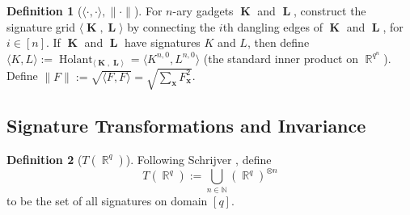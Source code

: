 \documentclass{article}
\theoremstyle{remark}
\theoremstyle{definition}
\newtheorem{definition}{Definition}[section]
\DeclareMathOperator{\rr}{\mathbb{R}}
\DeclareMathOperator{\vk}{\mathbf{K}}
\DeclareMathOperator{\vl}{\mathbf{L}}
\DeclareMathOperator{\vx}{\mathbf{x}}
\DeclareMathOperator{\holant}{Holant}
\begin{document}
\begin{definition}[$\langle\cdot,\cdot\rangle,\|\cdot\|$]
    For $n$-ary gadgets $\vk$ and $\vl$, construct the signature grid
    $\langle \vk,\vl \rangle$ by connecting the $i$th dangling edges
    of $\vk$ and $\vl$, for $i \in [n]$.
    If $\vk$ and $\vl$ have signatures $K$ and $L$, then define $\langle K,L \rangle
    := \holant_{\langle \vk,\vl\rangle} = \langle K^{n,0}, L^{n,0}\rangle$ (the standard
    inner product on $\rr^{q^n}$). Define $\|F\| := \sqrt{\langle F,F\rangle} = \sqrt{\sum_{\vx} F_{\vx}^2}$.
\end{definition}

\subsection{Signature Transformations and Invariance}
\begin{definition}[$T(\rr^q)$]
    Following Schrijver \cite{schrijver_tensor_2008}, define
    \[
        T(\rr^q) := \bigcup_{n \in \mathbb{N}} (\rr^q)^{\otimes n}
    \]
    to be the set of all signatures on domain $[q]$.
\end{definition}
\end{document}
